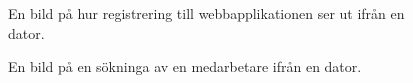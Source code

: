 \documentclass[a4paper,12pt]{article}
\begin{document}
 \begin{figure}[H]
   \centering
   \caption{En bild på hur registrering till webbapplikationen ser ut ifrån en dator.}
   \label{fig:comp_sign_in}
 \end{figure}

 \begin{figure}[H]
   \centering
   \caption{En bild på en sökninga av en medarbetare ifrån en dator.}
   \label{fig:comp_search}
 \end{figure}
 \leavevmode
\end{document}
